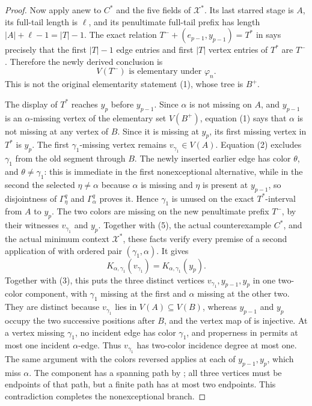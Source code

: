 \begin{proof}
Now apply  anew
to \(C^*\) and the five fields of \(\mathcal X^*\).  Its last starred
stage is \(A\), its full-tail length is \(\ell\), and its penultimate
full-tail prefix has length \(|A|+\ell-1=|T|-1\).  The exact relation
\(T^-+(e_{p-1},y_{p-1})=T^*\) in
 says precisely that the
first \(|T|-1\) edge entries and first \(|T|\) vertex entries of \(T^*\)
are \(T^-\).  Therefore the newly derived conclusion is
\[
                  V(T^-)\text{ is elementary under }\varphi_n.       \tag{5}
\]
This is not the original elementarity statement (1), whose tree is
\(B^+\).

The display of \(T^*\) reaches \(y_p\) before \(y_{p-1}\).  Since
\(\alpha\) is not missing on \(A\), and \(y_{p-1}\) is an
\(\alpha\)-missing vertex of the elementary set \(V(B^+)\), equation
(1) says that \(\alpha\) is not missing at any vertex of \(B\).  Since
it is missing at \(y_p\), its first missing vertex in \(T^*\) is
\(y_p\).  The first \(\gamma_1\)-missing vertex remains
\(v_{\gamma_1}\in V(A)\).  Equation (2) excludes \(\gamma_1\) from the
old segment through \(B\).  The newly inserted earlier edge has color
\(\theta\), and \(\theta\ne\gamma_1\): this is immediate in the first
nonexceptional alternative, while in the second the selected
\(\eta\ne\alpha\) because \(\alpha\) is missing and \(\eta\) is present
at \(y_{p-1}\), so disjointness of
\(\Gamma^q_\eta\) and \(\Gamma^q_\alpha\) proves it.  Hence
\(\gamma_1\) is unused on the exact \(T^*\)-interval from \(A\) to
\(y_p\).  The two colors are missing on the new penultimate prefix
\(T^-\), by their witnesses \(v_{\gamma_1}\) and \(y_p\).  Together
with (5), the actual counterexample \(C^*\), and the actual minimum
context \(\mathcal X^*\), these facts verify every premise of a second
application of  with ordered pair
\((\gamma_1,\alpha)\).  It gives
\[
 K_{\alpha,\gamma_1}(v_{\gamma_1})
      =K_{\alpha,\gamma_1}(y_p).                              \tag{6}
\]
Together with (3), this puts the three distinct vertices
\(v_{\gamma_1},y_{p-1},y_p\) in one two-color component, with
\(\gamma_1\) missing at the first and \(\alpha\) missing at the other
two.  They are distinct because \(v_{\gamma_1}\) lies in
\(V(A)\subseteq V(B)\), whereas \(y_{p-1}\) and \(y_p\) occupy the two
successive positions after \(B\), and the vertex map of
 is injective.  At a vertex missing
\(\gamma_1\), no incident edge has color \(\gamma_1\), and properness
in  permits at most one incident
\(\alpha\)-edge.  Thus \(v_{\gamma_1}\) has two-color incidence degree
at most one.  The same argument with the colors reversed applies at
each of \(y_{p-1},y_p\), which miss \(\alpha\).  The component has a
spanning path by ; all three
vertices must be endpoints of that path, but a finite path has at most
two endpoints.  This contradiction completes the nonexceptional branch.
\end{proof}
